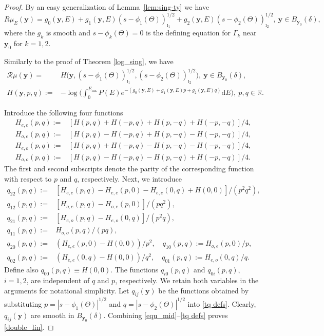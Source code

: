 \documentclass[11pt]{article}
\newcommand{\be}{\begin{equation}}
\newcommand{\ee}{\end{equation}}
\newcommand{\bs}{\begin{split}}
\newcommand{\CR}{\mathcal R}
\newcommand{\br}{\mathbb{R}}
\newcommand{\dd}{\mathrm{d}}
\newcommand{\de}{\delta}
\numberwithin{equation}{section}
\newcommand{\vy}{\mathbf{y}}
\theoremstyle{definition}
\begin{document}
\begin{proof}
By an easy generalization of Lemma~\ref{lem:sing-ty} we have
\be
\label{dist_R_1}
R\mu_E(\vy) =  g_0(\vy,E) + g_1(\vy,E) (s - \phi_1(\Theta))^{1/2}_{\imath_1} + g_2(\vy,E) (s - \phi_2(\Theta))^{1/2}_{\imath_2},\ \vy\in B_{\vy_0}(\delta),
\ee
where the $g_k$ is smooth and $s- \phi_k(\Theta) = 0$ is the defining equation for $\Gamma_k$ near $\vy_0$ for $k = 1,2$. 

Similarly to the proof of Theorem \ref{log_sing}, we have
\be
\label{equ_mid}
\begin{split}
\CR\mu(\vy) =&H\big(\vy,(s - \phi_1(\Theta))_{\imath_1}^{1/2},(s - \phi_2(\Theta))_{\imath_2}^{1/2}\big),\ \vy\in B_{\vy_0}(\delta),\\
H(\vy,p,q) :=&-\log\Big(\int_0^{E_{\mathrm{mx}}}P(E) e^{-(g_0(\vy,E) + g_1(\vy,E)p+ g_2(\vy,E)q)} \dd E\Big),\ p,q\in\br.
\end{split}
\ee 

Introduce the following four functions
\be\label{tH fns}\bs
H_{e,e}(p,q):=&[H(p,q)+H(-p,q)+H(p,-q)+H(-p,-q)]/4,\\
H_{o,e}(p,q):=&[H(p,q)-H(-p,q)+H(p,-q)-H(-p,-q)]/4,\\
H_{e,o}(p,q):=&[H(p,q)+H(-p,q)-H(p,-q)-H(-p,-q)]/4,\\
H_{o,o}(p,q):=&[H(p,q)-H(-p,q)-H(p,-q)+H(-p,-q)]/4.
\end{split}
\ee
The first and second subscripts denote the parity of the corresponding function with respect to $p$ and $q$, respectively. Next, we introduce
\be\label{tq defs}\bs
q_{22}(p,q):=&[H_{e,e}(p,q)-H_{e,e}(p,0)-H_{e,e}(0,q)+H(0,0)]/(p^2q^2),\\
q_{12}(p,q):=&[H_{o,e}(p,q)-H_{o,e}(p,0)]/(pq^2),\\
q_{21}(p,q):=&[H_{e,o}(p,q)-H_{e,o}(0,q)]/(p^2q),\\
q_{11}(p,q):=&H_{o,o}(p,q)/(pq),\\
q_{20}(p,q):=&(H_{e,e}(p,0)-H(0,0))/p^2,\quad q_{10}(p,q):=H_{o,e}(p,0)/p,\\
q_{02}(p,q):=&(H_{e,e}(0,q)-H(0,0))/q^2,\quad q_{01}(p,q):=H_{e,o}(0,q)/q.
\end{split}
\ee
Define also $q_{00}(p,q)\equiv H(0,0)$. The functions $q_{i0}(p,q)$ and $q_{0i}(p,q)$, $i=1,2$, are independent of $q$ and $p$, respectively. We retain both variables in the arguments for notational simplicity. Let $q_{ij}(\vy)$ be the functions obtained by substituting $p=|s - \phi_1(\Theta)|^{1/2}$ and $q=|s - \phi_2(\Theta)|^{1/2}$ into \eqref{tq defs}. Clearly, $q_{ij}(\vy)$ are smooth in $B_{\vy_0}(\de)$. Combining \eqref{equ_mid}--\eqref{tq defs} proves \eqref{double_lin}.
\end{proof}
\end{document}
